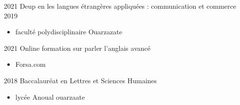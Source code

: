 %
%
%




\begin{experiences}
	\experience
	{2021}   {Deup en les langues étrangères appliquées : communication et commerce}{}{}
	{2019} {
		\begin{itemize}
			\item  faculté polydisciplinaire Ouarzazate
		\end{itemize}
	}
	{}
	\emptySeparator

		\experience
	{2021} {Online formation sur parler l'anglais avancé}{}{}
	{}    {
		\begin{itemize}
			\item  Forsa.com
		\end{itemize}
	}
	{}
	\emptySeparator

	\experience
	{2018} {Baccalauréat en Lettres et Sciences Humaines }{}{}
	{}    {
		\begin{itemize}
			\item lycée Anoual ouarzaate
		\end{itemize}
	}
	{}
	\emptySeparator

\end{experiences}



%
%
%
%
%

